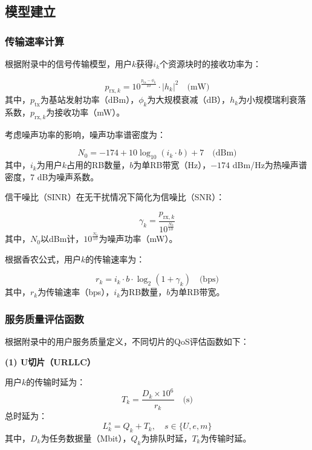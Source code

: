 \subsection{模型建立}

\subsubsection{传输速率计算}

根据附录中的信号传输模型，用户$k$获得$i_k$个资源块时的接收功率为：

\begin{equation}
p_{\text{rx},k} = 10^{\frac{p_{\text{tx}} - \phi_k}{10}} \cdot |h_k|^2 \quad \text{(mW)}
\end{equation}
其中，$p_{\text{tx}}$为基站发射功率（dBm），$\phi_k$为大规模衰减（dB），$h_k$为小规模瑞利衰落系数，$p_{\text{rx},k}$为接收功率（mW）。

考虑噪声功率的影响，噪声功率谱密度为：

\begin{equation}
N_0 = -174 + 10\log_{10}(i_k \cdot b) + 7 \quad \text{(dBm)}
\end{equation}
其中，$i_k$为用户$k$占用的RB数量，$b$为单RB带宽（Hz），$-174$ dBm/Hz为热噪声谱密度，$7$ dB为噪声系数。

信干噪比（SINR）在无干扰情况下简化为信噪比（SNR）：

\begin{equation}
\gamma_k = \frac{p_{\text{rx},k}}{10^{\frac{N_0}{10}}}
\end{equation}
其中，$N_0$以dBm计，$10^{\frac{N_0}{10}}$为噪声功率（mW）。

根据香农公式，用户$k$的传输速率为：

\begin{equation}
r_k = i_k \cdot b \cdot \log_2(1 + \gamma_k) \quad \text{(bps)}
\end{equation}
其中，$r_k$为传输速率（bps），$i_k$为RB数量，$b$为单RB带宽。

\subsubsection{服务质量评估函数}

根据附录中的用户服务质量定义，不同切片的QoS评估函数如下：

\textbf{(1) U切片（URLLC）}

用户$k$的传输时延为：
\begin{equation}
T_k = \frac{D_k \times 10^6}{r_k} \quad \text{(s)}
\end{equation}
总时延为：
\begin{equation}
L_k^{s} = Q_k + T_k, \quad s \in \{U, e, m\}
\end{equation}
其中，$D_k$为任务数据量（Mbit），$Q_k$为排队时延，$T_k$为传输时延。

